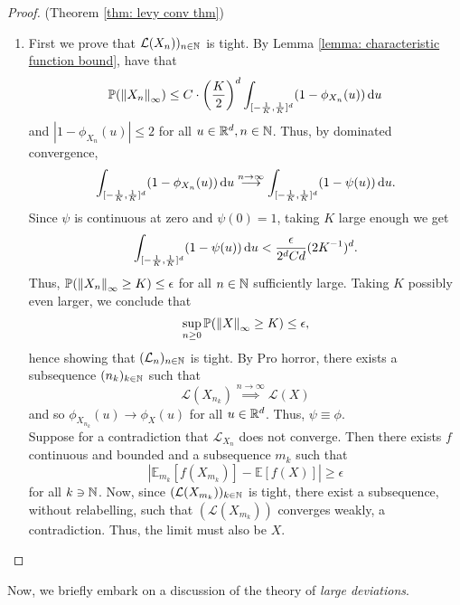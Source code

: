 \documentclass{article}
\begin{document}
\begin{proof}{(Theorem \ref{thm: levy conv thm})}
   \begin{enumerate}
	   $ f(x) = e^{i\bracket{u}{x}}$ is continuous and bounded so by bounded convergence, have 
	   \[
	   \phi_{X_{n}}(u) = \mathbb{E}\left[ f(X_{n}) \right]\to \mathbb{E}\left[ f(X) \right]
	   \]
	   as $ n\to \infty$. 
	   \item First we prove that $  \mathcal{L}(X_{n}))_{n\in \mathbb{N}}$ is tight. By Lemma \ref{lemma: characteristic function bound}, have that 
		   \[
		   	\mathbb{P}(\left\lVert X_{n}\right\rVert_{\infty})\leq C\cdot \left( \frac{K}{2} \right)^{d} \displaystyle\int_{[-\frac{1}{K}, \frac{1}{K}]^{d}} (1-\phi_{X_{n}}(u))  \operatorname{d}\!  u
		   \]
and $ |1-\phi_{X_{n}}(u)|\leq 2$ for all $ u\in \mathbb{R}^{d}, n\in \mathbb{N}$. Thus, by dominated convergence, 
\[
 \displaystyle\int_{[-\frac{1}{K}, \frac{1}{K}]^{d}} (1-\phi_{X_{n}}(u))  \operatorname{d}\!  u \stackrel{n\to \infty}{\longrightarrow} \displaystyle\int_{[-\frac{1}{K}, \frac{1}{K}]^{d}} (1-\psi(u))  \operatorname{d}\!  u. 
\]
Since $ \psi$ is continuous at zero and $ \psi(0) = 1$, taking $ K$ large enough we get 
\[
\displaystyle\int_{[-\frac{1}{K}, \frac{1}{K}]^{d}} (1-\psi(u))  \operatorname{d}\!  u <\frac{\epsilon}{2^d Cd}(2K^{-1})^{d}.
\]
Thus, $ \mathbb{P}(\left\lVert X_{n}\right\rVert_{\infty}\geq K)\leq \epsilon$ for all $ n\in \mathbb{N}$ sufficiently large. Taking $ K$ possibly even larger, we conclude that 
\[
	\displaystyle\sup_{n\geq 0}\mathbb{P}(\left\lVert X\right\rVert_{\infty}\geq K)\leq \epsilon,
\]
hence showing that $ ( \mathcal{L}_{n})_{n\in \mathbb{N}}$ is tight. By Pro horror, there exists a subsequence $ (n_{k})_{k\in \mathbb{N}}$ such that
\[
 \mathcal{L}(X_{n_{k}}) \stackrel{n\to \infty}{\implies} \mathcal{L}(X)
\]
and so $ \phi_{X_{n_{k}}}(u) \to \phi_{X}(u)$ for all $ u\in \mathbb{R}^{d}$. Thus, $ \psi \equiv \phi$.\\ 

Suppose for a contradiction that $ \mathcal{L}_{X_{n}
}$ does not converge. Then there exists $ f$ continuous and bounded and a subsequence $ m_{k}$ such that  
\[
 \left|\mathbb{E}_{m_{k}}\left[ f(X_{m_{k}}) \right] - \mathbb{E}\left[ f(X) \right]\right|\geq \epsilon
\]
for all $ k\ni \mathbb{N}$. Now, since $ (\mathcal{L}(X_{m_{k}}))_{k\in \mathbb{N}}
$ is tight, there exist a subsequence, without relabelling, such that $ ( \mathcal{L}(X_{m_{k}}))$ converges weakly, a contradiction. Thus, the limit must also be $ X$. 
   \end{enumerate}
    
\end{proof}

Now, we briefly embark on a discussion of the theory of \textit{large deviations}.
\end{document}
